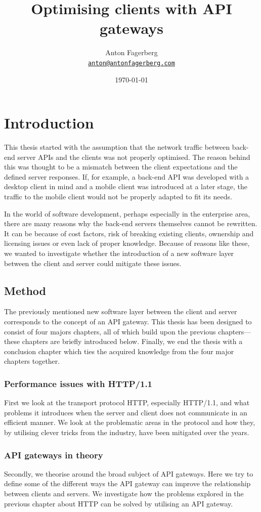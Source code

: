 \documentclass{cslthse-msc}
\author{
	Anton Fagerberg \\
	{\normalsize \href{mailto:anton@antonfagerberg.com}{\texttt{anton@antonfagerberg.com}}}
}
\title{Optimising clients with API gateways}
\subtitle{}
\date{\today}
\begin{document}
\makefrontmatter

\chapter{Introduction}
This thesis started with the assumption that the network traffic between back-end server APIs and the clients was not properly optimised. The reason behind this was thought to be a mismatch between the client expectations and the defined server responses. If, for example, a back-end API was developed with a desktop client in mind and a mobile client was introduced at a later stage, the traffic to the mobile client would not be properly adapted to fit its needs.

In the world of software development, perhaps especially in the enterprise area, there are many reasons why the back-end servers themselves cannot be rewritten. It can be because of cost factors, risk of breaking existing clients, ownership and licensing issues or even lack of proper knowledge. Because of reasons like these, we wanted to investigate whether the introduction of a new software layer between the client and server could mitigate these issues.

\section{Method}

The previously mentioned new software layer between the client and server corresponds to the concept of an API gateway. This thesis has been designed to consist of four majors chapters, all of which build upon the previous chapters---these chapters are briefly introduced below. Finally, we end the thesis with a conclusion chapter which ties the acquired knowledge from the four major chapters together.

\subsection{Performance issues with HTTP/1.1}
First we look at the transport protocol HTTP, especially HTTP/1.1, and what problems it introduces when the server and client does not communicate in an efficient manner. We look at the problematic areas in the protocol and how they, by utilising clever tricks from the industry, have been mitigated over the years.

\subsection{API gateways in theory}
Secondly, we theorise around the broad subject of API gateways. Here we try to define some of the different ways the API gateway can improve the relationship between clients and servers. We investigate how the problems explored in the previous chapter about HTTP can be solved by utilising an API gateway.
\end{document}
